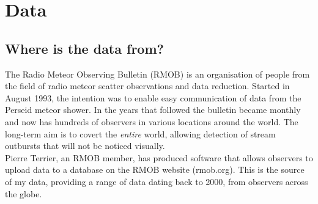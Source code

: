 \chapter{Data}
\label{chap:data}
\section{Where is the data from?}
The Radio Meteor Observing Bulletin (RMOB) \cite{rmob} is an organisation of people from the field of radio meteor scatter observations and data reduction. Started in August 1993, the intention was to enable easy communication of data from the Perseid meteor shower. In the years that followed the bulletin became monthly and now has hundreds of observers in various locations around the world. The long-term aim is to covert the {\it entire} world, allowing detection of stream outbursts that will not be noticed visually.\\
Pierre Terrier, an RMOB member, has produced software that allows observers to upload data to a database on the RMOB website (rmob.org). This is the source of my data, providing a range of data dating back to 2000, from observers across the globe.
